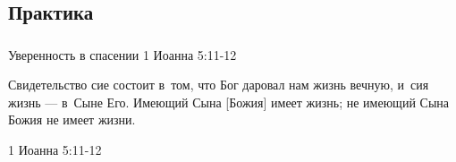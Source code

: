 \documentclass[t,aspectratio=169]{beamer}  %
\begin{document}
\subsection{Практика}
\begin{frame}[c]
	\frametitle{\insertsection}
	\framesubtitle{\insertsubsection}
	\begin{center}

  \begin{exampleblock}{Уверенность в спасении}
	1 Иоанна 5:11-12
	 
	 \vspace{6pt}

	 Свидетельство сие состоит в~том, \newline
	 что Бог даровал нам жизнь вечную, \newline
	 и~сия жизнь — в~Сыне Его. \newline
	 Имеющий Сына [Божия] имеет жизнь; \newline
	 не имеющий Сына Божия не имеет жизни.
	 \begin{flushright}
		1 Иоанна 5:11-12
	\end{flushright}
\end{exampleblock}
\end{center}
\end{frame}
\end{document}
